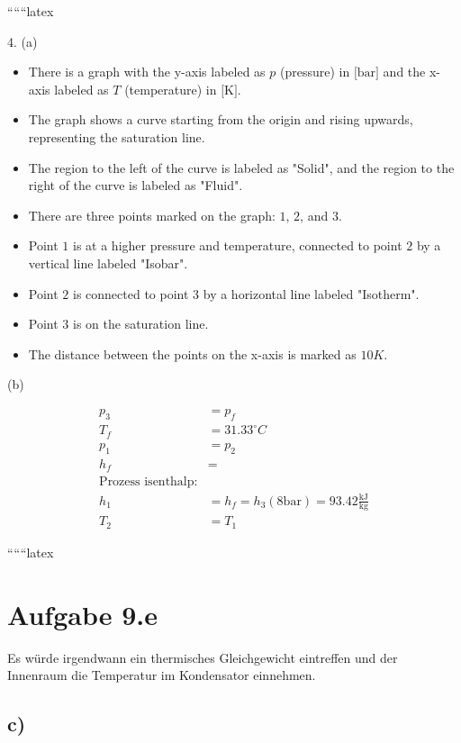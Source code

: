 
``````latex


4. (a)

\begin{itemize}
    \item There is a graph with the y-axis labeled as $p$ (pressure) in $\text{[bar]}$ and the x-axis labeled as $T$ (temperature) in $\text{[K]}$. 
    \item The graph shows a curve starting from the origin and rising upwards, representing the saturation line.
    \item The region to the left of the curve is labeled as "Solid", and the region to the right of the curve is labeled as "Fluid".
    \item There are three points marked on the graph: $1$, $2$, and $3$.
    \item Point $1$ is at a higher pressure and temperature, connected to point $2$ by a vertical line labeled "Isobar".
    \item Point $2$ is connected to point $3$ by a horizontal line labeled "Isotherm".
    \item Point $3$ is on the saturation line.
    \item The distance between the points on the x-axis is marked as $10K$.
\end{itemize}

(b)

\begin{align*}
    p_3 &= p_f \\
    T_f &= 31.33^\circ C \\
    p_1 &= p_2 \\
    h_f &= \\
    \text{Prozess isenthalp:} \\
    h_1 &= h_f = h_3 (8 \text{bar}) = 93.42 \frac{\text{kJ}}{\text{kg}} \\
    T_2 &= T_1
\end{align*}

``````latex


\section*{Aufgabe 9.e}

Es würde irgendwann ein thermisches Gleichgewicht eintreffen und der Innenraum die Temperatur im Kondensator einnehmen.

\subsection*{c)}

